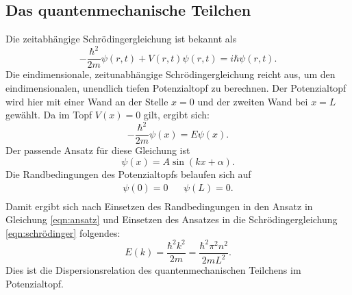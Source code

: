 \subsection{Das quantenmechanische Teilchen}
Die zeitabhängige Schrödingergleichung ist bekannt als
\begin{equation*}
  - \frac{ \hbar^2}{2 m} \psi(r, t) + V(r, t) \psi(r, t) = i \hbar \psi(r, t).
\end{equation*}
Die eindimensionale, zeitunabhängige Schrödingergleichung reicht aus, um den eindimensionalen, unendlich tiefen Potenzialtopf zu berechnen.
Der Potenzialtopf wird hier mit einer Wand an der Stelle $x=0$ und der zweiten Wand bei $x=L$ gewählt.
Da im Topf $V(x)=0$ gilt, ergibt sich:
\begin{equation}
  - \frac{ \hbar^2}{2 m} \psi(x) = E \psi(x).
  \label{eqn:schrödinger}
\end{equation}
Der passende Ansatz für diese Gleichung ist
\begin{equation}
  \psi(x)= A \sin{(kx+\alpha)}.
  \label{eqn:ansatz}
\end{equation}
Die Randbedingungen des Potenzialtopfs belaufen sich auf
\begin{align*}
    \psi(0)=0       && \psi(L)=0.\\
\end{align*}
Damit ergibt sich nach Einsetzen des Randbedingungen in den Ansatz in Gleichung \eqref{eqn:ansatz} und Einsetzen des Ansatzes in die Schrödingergleichung \eqref{eqn:schrödinger} folgendes:
\begin{equation}
  E(k) = \frac{\hbar^2 k^2}{2 m} = \frac{\hbar^2 \pi^2 n^2}{2 m L^2}.
  \label{eqn:dispersionqm}
\end{equation}
Dies ist die Dispersionsrelation des quantenmechanischen Teilchens im Potenzialtopf.
%
